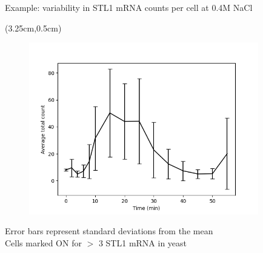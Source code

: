 \documentclass[aspectratio=1610]{beamer}					%
\begin{document}
\begin{frame}{Example: variability in STL1 mRNA counts per cell at 0.4M NaCl}

\begin{textblock*}{5cm}(3.25cm,0.5cm)
\begin{figure}
\includegraphics[width=10cm]{avg-count.png}
\end{figure}
\end{textblock*}

\vspace{7.25cm}
Error bars represent standard deviations from the mean\\
Cells marked ON for $>$ 3 STL1 mRNA in yeast

\end{frame}
\end{document}
